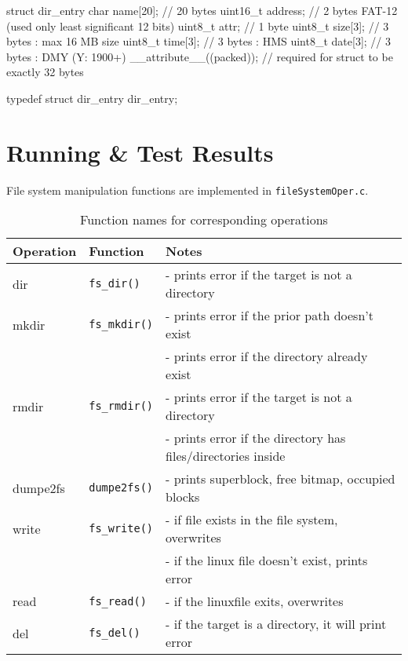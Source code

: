 \documentclass[a4paper]{article}
\begin{document}
\newpage

\begin{ccode}
struct dir_entry {
  char name[20];           // 20 bytes
  uint16_t address;        // 2 bytes FAT-12 (used only least significant 12 bits)
  uint8_t attr;            // 1 byte
  uint8_t size[3];         // 3 bytes : max 16 MB size
  uint8_t time[3];         // 3 bytes : HMS
  uint8_t date[3];         // 3 bytes : DMY (Y: 1900+)
} __attribute__((packed)); // required for struct to be exactly 32 bytes

typedef struct dir_entry dir_entry;
\end{ccode}


\section*{Running \& Test Results}
\label{sec:org572fa0f}

File system manipulation functions are implemented in \texttt{fileSystemOper.c}.

\begin{table}[htbp]
\caption{Function names for corresponding operations}
\centering
\begin{tabular}{l|l|l}
Operation & Function & Notes\\
\hline
\hline
dir & \texttt{fs\_dir()} & - prints error if the target is not a directory\\
\hline
mkdir & \texttt{fs\_mkdir()} & - prints error if the prior path doesn't exist\\
 &  & - prints error if the directory already exist\\
\hline
rmdir & \texttt{fs\_rmdir()} & - prints error if the target is not a directory\\
 &  & - prints error if the directory has files/directories inside\\
\hline
dumpe2fs & \texttt{dumpe2fs()} & - prints superblock, free bitmap, occupied blocks\\
\hline
write & \texttt{fs\_write()} & - if file exists in the file system, overwrites\\
 &  & - if the linux file doesn't exist, prints error\\
\hline
read & \texttt{fs\_read()} & - if the linuxfile exits, overwrites\\
\hline
del & \texttt{fs\_del()} & - if the target is a directory, it will print error\\
\end{tabular}
\end{table}
\end{document}
